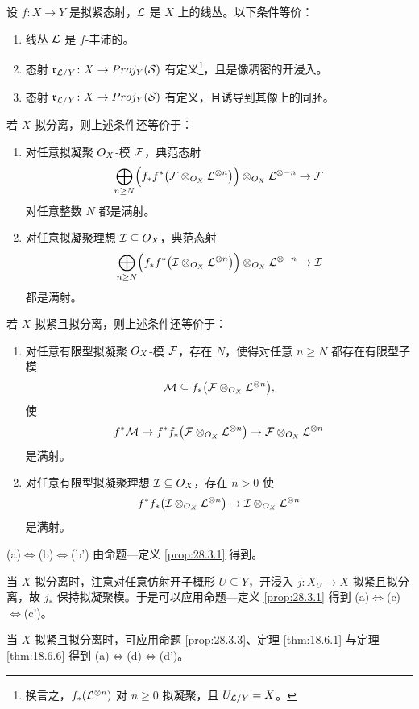\begin{corollary}\label{cor:28.4.3}
设 $f\colon X\to Y$ 是拟紧态射，$\mathcal{L}$ 是 $X$ 上的线丛。以下条件等价：
\begin{enumerate}[label=(\alph*),leftmargin=2.6em,itemsep=0.3ex]
  \item 线丛 $\mathcal{L}$ 是 $f$-丰沛的。
  \item 态射 $\mathfrak r_{\mathcal{L}/Y}\colon X\to Proj_Y(\mathcal S)$ 有定义\footnote{换言之，$f_*(\mathcal{L}^{\otimes n})$ 对 $n\ge 0$ 拟凝聚，且 $U_{\mathcal{L}/Y}=X$。}，且是像稠密的开浸入。
  \item[\textup{(b')}] 态射 $\mathfrak r_{\mathcal{L}/Y}\colon X\to Proj_Y(\mathcal S)$ 有定义，且诱导到其像上的同胚。
\end{enumerate}
若 $X$ 拟分离，则上述条件还等价于：
\begin{enumerate}[label=(\alph*),leftmargin=2.6em,itemsep=0.3ex,start=3]
  \item 对任意拟凝聚 $O_X$-模 $\mathcal{F}$，典范态射
  \[
  \bigoplus_{n\ge N}\Bigl(f_*f^*\bigl(\mathcal{F}\otimes_{O_X}\mathcal{L}^{\otimes n}\bigr)\Bigr)\otimes_{O_X}\mathcal{L}^{\otimes -n} \to \mathcal{F}
  \]
  对任意整数 $N$ 都是满射。
  \item[\textup{(c')}] 对任意拟凝聚理想 $\mathcal{I}\subseteq O_X$，典范态射
  \[
  \bigoplus_{n\ge N}\Bigl(f_*f^*\bigl(\mathcal{I}\otimes_{O_X}\mathcal{L}^{\otimes n}\bigr)\Bigr)\otimes_{O_X}\mathcal{L}^{\otimes -n} \to \mathcal{I}
  \]
  都是满射。
\end{enumerate}
若 $X$ 拟紧且拟分离，则上述条件还等价于：
\begin{enumerate}[label=(\alph*),leftmargin=2.6em,itemsep=0.3ex,start=5]
  \item[\textup{(d)}] 对任意有限型拟凝聚 $O_X$-模 $\mathcal{F}$，存在 $N$，使得对任意 $n\ge N$ 都存在有限型子模
  \[
  \mathcal{M}\subseteq f_*\bigl(\mathcal{F}\otimes_{O_X}\mathcal{L}^{\otimes n}\bigr),
  \]
  使
  \[
  f^*\mathcal{M} \to f^*f_*\bigl(\mathcal{F}\otimes_{O_X}\mathcal{L}^{\otimes n}\bigr) \to \mathcal{F}\otimes_{O_X}\mathcal{L}^{\otimes n}
  \]
  是满射。
  \item[\textup{(d')}] 对任意有限型拟凝聚理想 $\mathcal{I}\subseteq O_X$，存在 $n>0$ 使
  \[
  f^*f_*\bigl(\mathcal{I}\otimes_{O_X}\mathcal{L}^{\otimes n}\bigr) \to \mathcal{I}\otimes_{O_X}\mathcal{L}^{\otimes n}
  \]
  是满射。
\end{enumerate}
\end{corollary}

\begin{proofsketch}
(a)$\Leftrightarrow$(b)$\Leftrightarrow$(b') 由命题—定义 \ref{prop:28.3.1} 得到。

当 $X$ 拟分离时，注意对任意仿射开子概形 $U\subseteq Y$，开浸入 $j\colon X_U\to X$ 拟紧且拟分离，故 $j_*$ 保持拟凝聚模。于是可以应用命题—定义 \ref{prop:28.3.1} 得到 (a)$\Leftrightarrow$(c)$\Leftrightarrow$(c')。

当 $X$ 拟紧且拟分离时，可应用命题 \ref{prop:28.3.3}、定理 \ref{thm:18.6.1} 与定理 \ref{thm:18.6.6} 得到 (a)$\Leftrightarrow$(d)$\Leftrightarrow$(d')。
\end{proofsketch}

